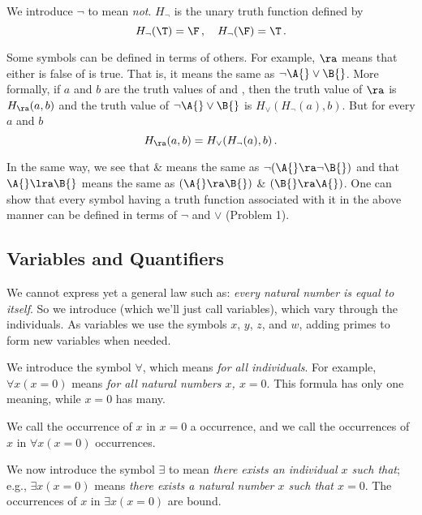 We introduce $\neg$ to mean \emph{not}.
$H_\neg$ is the unary truth function defined by
\begin{equation}
    H_\neg(\T) = \F\,, \quad H_\neg(\F) = \T\,.
\end{equation}

Some symbols can be defined in terms of others.
For example, \A $\ra$ \B{} means that either \A{} is false of \B{} is true.
That is, it means the same as $\neg \A{} \vee \B{}$.
More formally, if $a$ and $b$ are the truth values of \A{} and \B{}, then the truth value of \A $\ra$ \B{} is $H_\ra(a,b)$ and the truth value of $\neg \A{} \vee \B{}$ is $H_\vee(H_\neg(a),b)$.
But for every $a$ and $b$
\begin{equation}
    H_\ra(a,b) = H_\vee(H_\neg(a),b)\,.
\end{equation}

In the same way, we see that \A{} \& \B{} means the same as $\neg(\A{} \ra \neg \B{})$ and that $\A{} \lra \B{}$ means the same as $(\A{} \ra \B{})$ \& $(\B{} \ra \A{})$.
One can show that every symbol having a truth function associated with it in the above manner can be defined in terms of $\neg$ and $\vee$ (Problem 1).


\subsection{Variables and Quantifiers}

We cannot express yet a general law such as: \emph{every natural number is equal to itself}.
So we introduce  (which we'll just call variables), which vary through the individuals.
As variables we use the symbols $x$, $y$, $z$, and $w$, adding primes to form new variables when needed.

We introduce the symbol $\forall$, which means \emph{for all individuals}.
For example, $\forall x (x = 0)$ means \emph{for all natural numbers $x$, $x = 0$}.
This formula has only one meaning, while $x = 0$ has many.

We call the occurrence of $x$ in $x = 0$ a  occurrence, and we call the occurrences of $x$ in $\forall x (x = 0)$  occurrences.

We now introduce the symbol $\exists$ to mean \emph{there exists an individual $x$ such that};
e.g., $\exists x(x = 0)$ means \emph{there exists a natural number $x$ such that $x = 0$}.
The occurrences of $x$ in $\exists x (x = 0)$ are bound.


